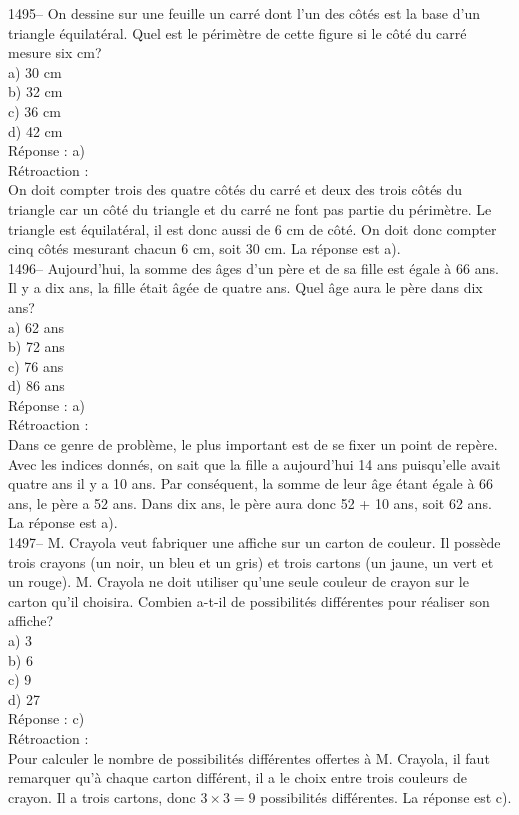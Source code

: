 1495-- On dessine sur une feuille un carr\'e dont l'un des c\^ot\'es est la
base d'un triangle \'equilat\'eral. Quel est le
p\'erim\`etre de cette
figure si le c\^ot\'e du carr\'e mesure six cm?\\
a) 30 cm\\
b) 32 cm\\
c) 36 cm\\
d) 42 cm\\

R\'eponse : a)\\

R\'etroaction :\\
On doit compter trois des quatre c\^ot\'es du carr\'e et deux des
trois c\^ot\'es du triangle car un c\^ot\'e du triangle et du
carr\'e ne font pas partie du p\'erim\`etre. Le triangle est
\'equilat\'eral, il est donc aussi de 6 cm de c\^ot\'e. On doit
donc compter cinq c\^ot\'es mesurant chacun 6 cm, soit 30 cm. La r\'eponse
est a).\\

1496-- Aujourd'hui, la somme des \^ages d'un p\`ere et de sa fille est
\'egale \`a 66 ans. Il y a dix ans, la fille \'etait \^ag\'ee de
quatre ans. Quel
\^age aura le p\`ere dans dix ans?\\
a) 62 ans\\
b) 72 ans\\
c) 76 ans\\
d) 86 ans\\

R\'eponse : a)\\

R\'etroaction :\\
Dans ce genre de probl\`eme, le plus important est de se fixer un
point de rep\`ere. Avec les indices donn\'es, on sait que la fille a
aujourd'hui 14 ans puisqu'elle avait quatre ans il y a 10 ans. Par
cons\'equent, la somme de leur \^age \'etant \'egale \`a 66 ans, le
p\`ere a 52 ans. \vskip 10pt \noindent
Dans dix ans, le p\`ere aura donc 52 + 10 ans, soit 62 ans. La r\'eponse est
a).\\

1497-- M. Crayola veut fabriquer une affiche sur un carton de couleur.
Il poss\`ede trois crayons (un noir, un bleu et un gris) et trois
cartons (un jaune, un vert et un rouge). M. Crayola ne doit utiliser
qu'une seule couleur de crayon sur le carton qu'il choisira. Combien
a-t-il de possibilit\'es diff\'erentes pour r\'ealiser son affiche?\\
a) 3\\
b) 6\\
c) 9\\
d) 27\\[3mm]
R\'eponse : c)\\[3mm]
R\'etroaction :\\
Pour calculer le nombre de possibilit\'es diff\'erentes offertes \`a
M. Crayola, il faut remarquer qu'\`a chaque carton diff\'erent, il a
le choix entre trois couleurs de crayon. Il a trois cartons, donc
$3\times3=9$ possibilit\'es
diff\'erentes. La r\'eponse est c).\\


